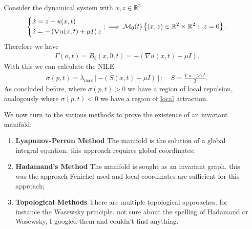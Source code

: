 \begin{ex}
	Consider the dynamical system with $x,z\in \mathbb{R}^{2}$
	\begin{align}
		\begin{dcases}
			\dot{x} = z + u(x,t) \\
			\dot{z} = - \left( \nabla u(x,t) + \mu I \right) z
		\end{dcases}
		; \implies \mathcal{M}_{0}(t) \left\{ (x,z) \in \mathbb{R}^{2}\times \mathbb{R}^{2}:\ z =0\right\}.	
	\end{align}
Therefore we have 
\begin{align}
	\Gamma(a,t) = B_{b}(x,0,t) = - \left(\nabla u(x,t) + \mu I \right).
\end{align}
With this we can calculate the NILE
\begin{align}
	\sigma(p,t) = \lambda _{ \textrm{max} } \left[ - (S(x,t) + \mu I ) \right]; \quad S = \frac{\nabla u + \nabla u^{t}}{2}.
\end{align}
As concluded before, where $\sigma(p,t)>0$ we have a region of \underline{local} repulsion, analogously where $\sigma(p,t) <0$ we have a region of \underline{local} attraction.
\end{ex}

We now turn to the various methods to prove the existence of an invariant manifold:
\begin{enumerate}
	\item \textbf{Lyapunov-Perron Method} The manifold is the solution of a global integral equation, this approach requires global coordinates;
	\item \textbf{Hadamand's Method} The manifold is sought as an invariant graph, this was the approach Fenichel used and local coordinates are sufficient for this approach;
	\item \textbf{Topological Methods} There are multiple topological approaches, for instance the Wasewsky principle.
		{\color{blue} not sure about the spelling of Hadamand or Wasewsky, I googled them and couldn't find anything.}
\end{enumerate}

